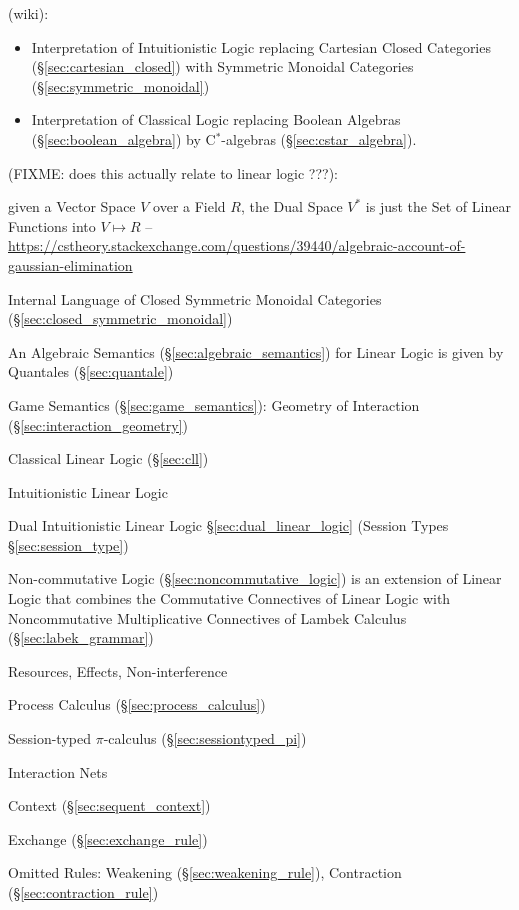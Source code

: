 (wiki):

\begin{itemize}
\item Interpretation of Intuitionistic Logic replacing Cartesian Closed
  Categories (\S\ref{sec:cartesian_closed}) with Symmetric Monoidal
  Categories (\S\ref{sec:symmetric_monoidal})
\item Interpretation of Classical Logic replacing Boolean Algebras
  (\S\ref{sec:boolean_algebra}) by C$^*$-algebras
  (\S\ref{sec:cstar_algebra}).
\end{itemize}

(FIXME: does this actually relate to linear logic ???):

given a Vector Space $V$ over a Field $R$, the Dual Space $V^*$ is just the Set
of Linear Functions into $V \mapsto R$
--\url{https://cstheory.stackexchange.com/questions/39440/algebraic-account-of-gaussian-elimination}


\asterism


Internal Language of Closed Symmetric Monoidal Categories
(\S\ref{sec:closed_symmetric_monoidal})

An Algebraic Semantics (\S\ref{sec:algebraic_semantics}) for Linear
Logic is given by Quantales (\S\ref{sec:quantale})

Game Semantics (\S\ref{sec:game_semantics}): Geometry of Interaction
(\S\ref{sec:interaction_geometry})

Classical Linear Logic (\S\ref{sec:cll})

Intuitionistic Linear Logic

Dual Intuitionistic Linear Logic \S\ref{sec:dual_linear_logic}
(Session Types \S\ref{sec:session_type}) \cite{caires-pfenning10}

\fist Non-commutative Logic (\S\ref{sec:noncommutative_logic}) is an
extension of Linear Logic that combines the Commutative Connectives of
Linear Logic with Noncommutative Multiplicative Connectives of Lambek
Calculus (\S\ref{sec:labek_grammar})

Resources, Effects, Non-interference \cite{caires-pfenning10}

Process Calculus (\S\ref{sec:process_calculus})

Session-typed $\pi$-calculus (\S\ref{sec:sessiontyped_pi})

Interaction Nets %

Context (\S\ref{sec:sequent_context})

Exchange (\S\ref{sec:exchange_rule})

Omitted Rules: Weakening (\S\ref{sec:weakening_rule}), Contraction
(\S\ref{sec:contraction_rule})

